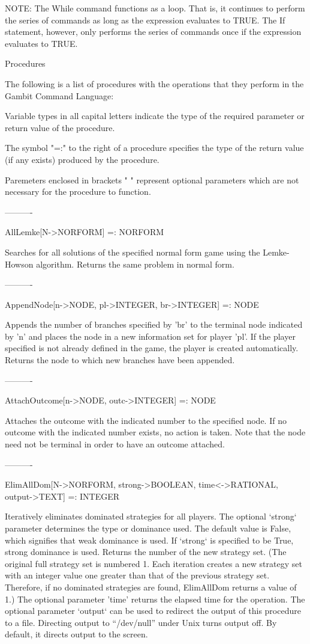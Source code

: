 	NOTE:	The While command functions as a loop.  That is, it continues
		to perform the series of commands as long as the expression
		evaluates to TRUE.  The If statement, however, only performs
		the series of commands once if the expression evaluates to
		TRUE.


Procedures

The following is a list of procedures with the operations that they perform
in the Gambit Command Language:

Variable types in all capital letters indicate the type of the required
parameter or return value of the procedure.

The symbol "=:" to the right of a procedure specifies the type of the return
value (if any exists) produced by the procedure.

Paremeters enclosed in brackets "{ }" represent optional parameters which
are not necessary for the procedure to function.

----------

AllLemke[N->NORFORM] =: NORFORM

	Searches for all solutions of the specified normal form game using the
Lemke-Howson algorithm.  Returns the same problem in normal form.

----------

AppendNode[n->NODE, pl->INTEGER, br->INTEGER] =: NODE

	Appends the number of branches specified by 'br' to the terminal node 
indicated by 'n' and places the node in a new information set for player 'pl'.
If the player specified is not already defined in the game, the player is 
created automatically.  Returns the node to which new branches have been
appended.

----------

AttachOutcome[n->NODE, outc->INTEGER] =: NODE

	Attaches the outcome with the indicated number to the specified node.
If no outcome with the indicated number exists, no action is taken.  Note that
the node need not be terminal in order to have an outcome attached.

----------

ElimAllDom[N->NORFORM, {strong->BOOLEAN}, {time<->RATIONAL}, {output->TEXT}] 
	=: INTEGER

	Iteratively eliminates dominated strategies for all players.  The 
optional `strong` parameter determines the type or dominance used.  The
default value is False, which signifies that weak dominance is used.  If 
`strong` is specified to be True, strong dominance is used.  Returns the
number of the new strategy set.  (The original full strategy set is 
numbered 1.  Each iteration creates a new strategy set with an integer value
one greater than that of the previous strategy set.  Therefore, if no
dominated strategies are found, ElimAllDom returns a value of 1.)  The
optional parameter 'time' returns the elapsed time for the operation.  The 
optional parameter `output` can be used to redirect the output of this 
procedure to a file.  Directing output to ``/dev/null'' under Unix turns output
off.  By default, it directs output to the screen.

